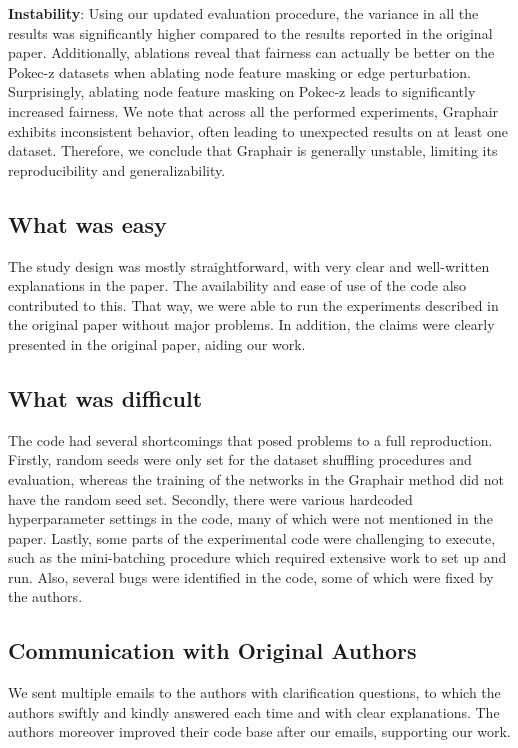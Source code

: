 \textbf{Instability}: Using our updated evaluation procedure, the variance in all the results was significantly higher compared to the results reported in the original paper. 
Additionally, ablations reveal that fairness can actually be better on the Pokec-z datasets when ablating node feature masking or edge perturbation. 
Surprisingly, ablating node feature masking on Pokec-z leads to significantly increased fairness. 
We note that across all the performed experiments, Graphair exhibits inconsistent behavior, often leading to unexpected results on at least one dataset. 
Therefore, we conclude that Graphair is generally unstable, limiting its reproducibility and generalizability.


\subsection{What was easy}

The study design was mostly straightforward, with very clear and well-written explanations in the paper. The availability and ease of use of the code also contributed to this. That way, we were able to run the experiments described in the original paper without major problems. In addition, the claims were clearly presented in the original paper, aiding our work.

\subsection{What was difficult}

The code had several shortcomings that posed problems to a full reproduction. 
Firstly, random seeds were only set for the dataset shuffling procedures and evaluation, whereas the training of the networks in the Graphair method did not have the random seed set. 
Secondly, there were various hardcoded hyperparameter settings in the code, many of which were not mentioned in the paper. Lastly, some parts of the experimental code were challenging to execute, such as the mini-batching procedure which required extensive work to set up and run.
Also, several bugs were identified in the code, some of which were fixed by the authors.

\subsection{Communication with Original Authors}

We sent multiple emails to the authors with clarification questions, to which the authors swiftly and kindly answered each time and with clear explanations. The authors moreover improved their code base after our emails, supporting our work.



